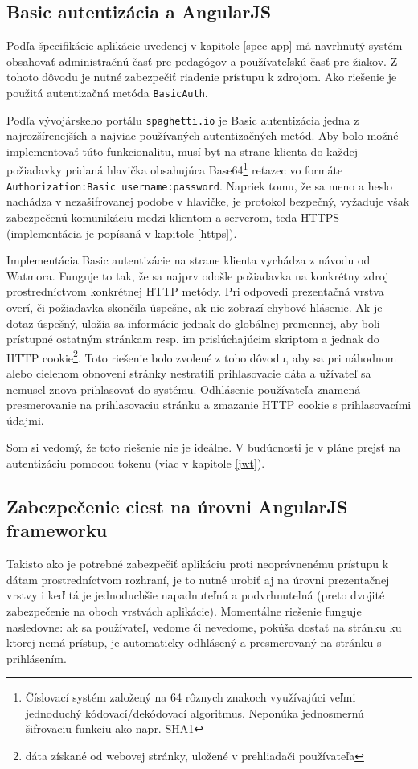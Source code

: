 \documentclass[12pt,oneside]{fithesis2}
\begin{document}
		\subsection{Basic autentizácia a AngularJS} \label{basic-auth}
      		\par Podľa špecifikácie aplikácie uvedenej v kapitole \ref{spec-app} má navrhnutý systém obsahovať administračnú časť pre pedagógov a používateľskú časť pre žiakov. Z tohoto dôvodu je nutné zabezpečiť riadenie prístupu k zdrojom. Ako riešenie je použitá autentizačná metóda \texttt{BasicAuth}.
      		\par Podľa vývojárskeho portálu \texttt{spaghetti.io}\cite{spaghetti14} je Basic autentizácia jedna z najrozšírenejších a najviac používaných autentizačných metód. Aby bolo možné implementovať túto funkcionalitu, musí byť na strane klienta do každej požiadavky pridaná hlavička obsahujúca Base64\footnote{Číslovací systém založený na 64 rôznych znakoch využívajúci veľmi jednoduchý kódovací/dekódovací algoritmus. Neponúka jednosmernú šifrovaciu funkciu ako napr. SHA1} reťazec vo formáte \texttt{Authorization:Basic username:password}. Napriek tomu, že sa meno a heslo nachádza v nezašifrovanej podobe v hlavičke, je protokol bezpečný, vyžaduje však zabezpečenú komunikáciu medzi klientom a serverom, teda HTTPS (implementácia je popísaná v kapitole \ref{https}). 
      		\par Implementácia Basic autentizácie na strane klienta vychádza z návodu od Watmora\cite{watmore14}. Funguje to tak, že sa najprv odošle požiadavka na konkrétny zdroj prostredníctvom konkrétnej HTTP metódy. Pri odpovedi prezentačná vrstva overí, či požiadavka skončila úspešne, ak nie zobrazí chybové hlásenie. Ak je dotaz úspešný, uložia sa informácie jednak do globálnej premennej, aby boli prístupné ostatným stránkam resp. im prislúchajúcim skriptom a jednak do HTTP cookie\footnote{dáta získané od webovej stránky, uložené v prehliadači používateľa}. Toto riešenie bolo zvolené z toho dôvodu, aby sa pri náhodnom alebo cielenom obnovení stránky nestratili prihlasovacie dáta a užívateľ sa nemusel znova prihlasovať do systému. Odhlásenie používateľa znamená presmerovanie na prihlasovaciu stránku a zmazanie HTTP cookie s prihlasovacími údajmi.
      		\par Som si vedomý, že toto riešenie nie je ideálne. V budúcnosti je v pláne prejsť na autentizáciu pomocou tokenu (viac v kapitole \ref{jwt}).
      		
		\subsection{Zabezpečenie ciest na úrovni AngularJS frameworku}
      		\par Takisto ako je potrebné zabezpečiť aplikáciu proti neoprávnenému prístupu k dátam prostredníctvom rozhraní, je to nutné urobiť aj na úrovni prezentačnej vrstvy i keď tá je jednoduchšie napadnuteľná a podvrhnuteľná (preto dvojité zabezpečenie na oboch vrstvách aplikácie). Momentálne riešenie funguje nasledovne: ak sa používateľ, vedome či nevedome, pokúša dostať na stránku ku ktorej nemá prístup, je automaticky odhlásený a presmerovaný na stránku s prihlásením.
\end{document}
